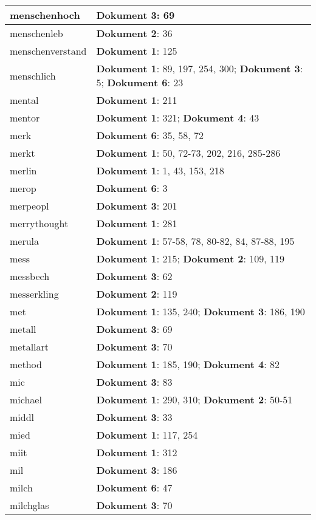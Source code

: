 \documentclass[a5paper]{article}
\begin{document}
\begin{longtable}[l]{|l|p{3in}|}
\hline
menschenhoch & \textbf{Dokument 3}: 69 \\
\hline
menschenleb & \textbf{Dokument 2}: 36 \\
\hline
menschenverstand & \textbf{Dokument 1}: 125 \\
\hline
menschlich & \textbf{Dokument 1}: 89, 197, 254, 300; \textbf{Dokument 3}: 5; \textbf{Dokument 6}: 23 \\
\hline
mental & \textbf{Dokument 1}: 211 \\
\hline
mentor & \textbf{Dokument 1}: 321; \textbf{Dokument 4}: 43 \\
\hline
merk & \textbf{Dokument 6}: 35, 58, 72 \\
\hline
merkt & \textbf{Dokument 1}: 50, 72-73, 202, 216, 285-286 \\
\hline
merlin & \textbf{Dokument 1}: 1, 43, 153, 218 \\
\hline
merop & \textbf{Dokument 6}: 3 \\
\hline
merpeopl & \textbf{Dokument 3}: 201 \\
\hline
merrythought & \textbf{Dokument 1}: 281 \\
\hline
merula & \textbf{Dokument 1}: 57-58, 78, 80-82, 84, 87-88, 195 \\
\hline
mess & \textbf{Dokument 1}: 215; \textbf{Dokument 2}: 109, 119 \\
\hline
messbech & \textbf{Dokument 3}: 62 \\
\hline
messerkling & \textbf{Dokument 2}: 119 \\
\hline
met & \textbf{Dokument 1}: 135, 240; \textbf{Dokument 3}: 186, 190 \\
\hline
metall & \textbf{Dokument 3}: 69 \\
\hline
metallart & \textbf{Dokument 3}: 70 \\
\hline
method & \textbf{Dokument 1}: 185, 190; \textbf{Dokument 4}: 82 \\
\hline
mic & \textbf{Dokument 3}: 83 \\
\hline
michael & \textbf{Dokument 1}: 290, 310; \textbf{Dokument 2}: 50-51 \\
\hline
middl & \textbf{Dokument 3}: 33 \\
\hline
mied & \textbf{Dokument 1}: 117, 254 \\
\hline
miit & \textbf{Dokument 1}: 312 \\
\hline
mil & \textbf{Dokument 3}: 186 \\
\hline
milch & \textbf{Dokument 6}: 47 \\
\hline
milchglas & \textbf{Dokument 3}: 70 \\

\end{longtable}
\end{document}
